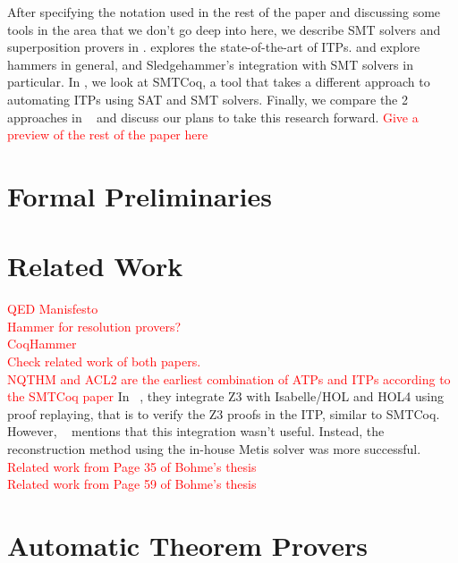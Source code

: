 \documentclass{article}
\begin{document}
	After specifying the notation used in the rest of the 
	paper and discussing some tools in the area that 
	we don't go deep into here, we describe SMT solvers
	and superposition provers in .
	 explores the state-of-the-art 
	of ITPs.  and 
	explore hammers in general, and Sledgehammer's
	integration with SMT solvers in particular. In
	, we look at SMTCoq, a tool that 
	takes a different approach to automating ITPs
	using SAT and SMT solvers. Finally, we compare 
	the 2 approaches in ~ and discuss
	our plans to take this research forward.
	\textcolor{red}{Give a preview of the rest of the paper here}

\section{Formal Preliminaries}
\label{sec:prelim}

\section{Related Work}
\label{sec:rel}
	\textcolor{red}{QED Manisfesto}\\
	\textcolor{red}{Hammer for resolution provers?}\\
	\textcolor{red}{CoqHammer}\\
	\textcolor{red}{Check related work of both papers.}\\
	\textcolor{red}{NQTHM and ACL2 are the earliest combination of ATPs and ITPs according to the SMTCoq paper}
	In ~\cite{10.1007/978-3-642-14052-5_14}, they integrate 
	Z3 with Isabelle/HOL and HOL4 
	using proof replaying, that is to verify 
	the Z3 proofs in the ITP, similar to SMTCoq. However, 
	~\cite{10.1007/978-3-642-22438-6_11} mentions that this
	integration wasn't useful. Instead, the reconstruction 
	method using the in-house Metis solver was more 
	successful. \\
	\textcolor{red}{Related work from Page 35 of Bohme's thesis}\\
	\textcolor{red}{Related work from Page 59 of Bohme's thesis}\\
	
\section{Automatic Theorem Provers}
\label{sec:atp}	
\end{document}
